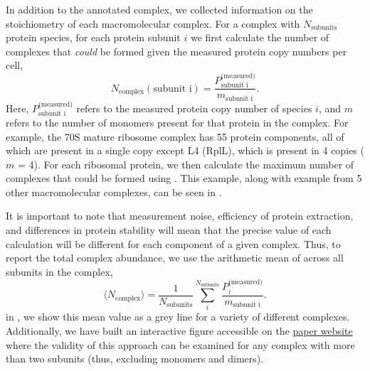 In addition to the annotated complex, we collected information on the
stoichiometry of each macromolecular complex. For a complex with $N_\text{subunits}$ protein species,
for each protein subunit $i$ we first calculate the number of complexes that
\textit{could} be formed given the measured protein copy numbers per cell,
\begin{equation}
    N_\text{complex}(\text{subunit i}) = \frac{P_\text{subunit i}^\text{(measured)}}{m_\text{subunit i}}.
    \label{eq:subunit_max}
\end{equation}
Here, $P_\text{subunit i}^\text{(measured)}$ refers to the measured protein copy number of species $i$,
and $m$ refers to the number of monomers present for that protein in the complex. For example, the 70S mature ribosome complex has 55 protein components, all of
which are present in a single copy except L4 (RplL), which is present in 4
copies ($m$ = 4). For each ribosomal protein, we then calculate the  maximum number of
complexes that could be formed using . This example, along with
example from 5 other macromolecular complexes, can be seen in
.

It is important to note that measurement noise, efficiency of protein
extraction, and differences in protein stability will mean that the precise value of each
calculation will be different for each component of a given complex. Thus, to
report the total complex abundance, we use the arithmetic mean of
across all subunits in the complex,
\begin{equation}
   \langle N_\text{complex} \rangle = \frac{1}{N_\text{subunits}}\sum\limits_i^{N_\text{subunits}} \frac{P_{i}^\text{(measured)}}{m_\text{subunit i}}.
   \label{eq:complex_count}
\end{equation}
in , we show this mean value as a grey line for a variety
of different complexes. Additionally, we have built an interactive figure
accessible on the \href{https://www.rpgroup.caltech.edu/growth_limits}{paper
website} where the validity of this approach can be examined for any complex
with more than two subunits (thus, excluding monomers and dimers).

